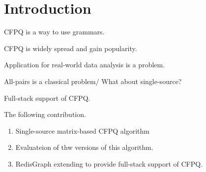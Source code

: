 \section{Introduction}

CFPQ is a way to use grammars.

CFPQ is widely spread and gain popularity.

Application for real-world data analysis is a problem.

All-pairs is a classical problem/ What about single-source?

Full-stack support of CFPQ.

The following contribution.
\begin{enumerate}
	\item Single-source matrix-based CFPQ algorithm
	\item Evaluateion of thw versions of this algorithm.
	\item RedisGraph extending to provide full-stack support of CFPQ.
\end{enumerate}